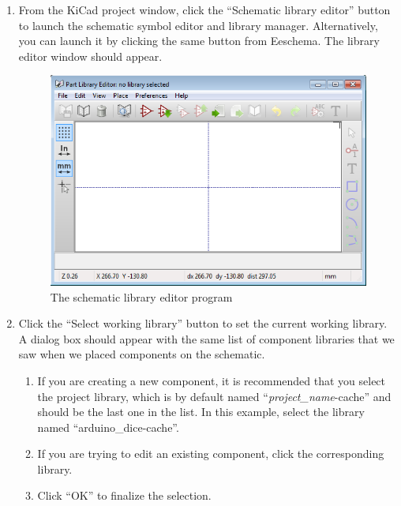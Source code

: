 \documentclass[12pt,letterpaper]{scrartcl}
\begin{document}
\begin{enumerate}
	\item From the KiCad project window, click the ``Schematic library editor'' button to launch the schematic symbol editor and library manager. Alternatively, you can launch it by clicking the same button from Eeschema. The library editor window should appear.
	
	\begin{figure}[h]
		\centering
		\includegraphics[width=0.6\linewidth]{sche-lib-editor}
		\caption{The schematic library editor program}
		\label{fig:sche-lib-editor}
	\end{figure}
	
	\item Click the ``Select working library'' button to set the current working library. A dialog box should appear with the same list of component libraries that we saw when we placed components on the schematic. 
		\begin{enumerate}
			\item If you are creating a new component, it is recommended that you select the project library, which is by default named ``\textit{project\_name}-cache'' and should be the last one in the list. In this example, select the library named ``arduino\_dice-cache''. 
			
			\item If you are trying to edit an existing component, click the corresponding library.
			
			\item Click ``OK'' to finalize the selection. 
		\end{enumerate}
	

\end{enumerate}
\end{document}

